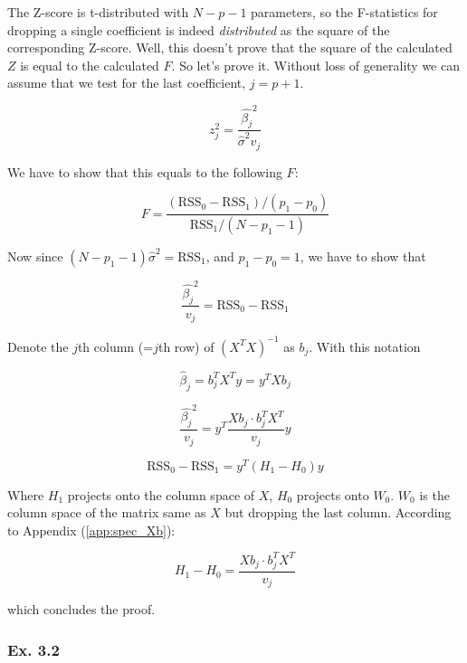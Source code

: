 \documentclass{article}
\begin{document}
The Z-score is t-distributed with $N-p-1$ parameters, so the F-statistics for dropping a single coefficient is indeed \emph{distributed} as the square of the corresponding Z-score. Well, this doesn't prove that the square of the calculated $Z$ is equal to the calculated $F$. So let's prove it. Without loss of generality we can assume that we test for the last coefficient, $j=p+1$.

\begin{equation}
    z^2_j = \frac{\hat{\beta_j}^2}{\hat{\sigma}^2 v_j}
\end{equation}

We have to show that this equals to the following $F$:

\begin{equation}
    F = \frac{(\text{RSS}_0 - \text{RSS}_1)/(p_1 - p_0)}{\text{RSS}_1/(N-p_1-1)}
\end{equation}

Now since $(N-p_1-1)\hat{\sigma}^2 = \text{RSS}_1$, and $p_1 - p_0 = 1$, we have to show that

\begin{equation}
    \frac{\hat{\beta_j}^2}{v_j} = \text{RSS}_0 - \text{RSS}_1
\end{equation}

Denote the $j$th column (=$j$th row) of $(X^TX)^{-1}$ as $b_j$. With this notation

\begin{equation}
    \hat{\beta}_j = b^T_j X^Ty = y^T X b_j
\end{equation}

\begin{equation}
    \frac{\hat{\beta_j}^2}{v_j} = y^T \frac{Xb_j \cdot b^T_j X^T}{v_j} y
\end{equation}

\begin{equation}
    \text{RSS}_0 - \text{RSS}_1 = y^T (H_1 - H_0) y
\end{equation}

Where $H_1$ projects onto the column space of $X$, $H_0$ projects onto $W_0$. $W_0$ is the column space of the matrix same as $X$ but dropping the last column. According to Appendix (\ref{app:spec_Xb}):

\begin{equation}
    H_1 - H_0 = \frac{Xb_j \cdot b^T_j X^T}{v_j}
\end{equation}

which concludes the proof.

\subsubsection{Ex. 3.2}
\end{document}
